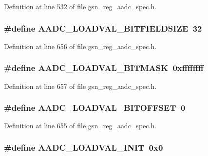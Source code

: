 Definition at line 532 of file gsn\_\-reg\_\-aadc\_\-spec.h.

\hypertarget{a00543_a5081bd03786964121c7734bd7abce77c}{
\subsubsection[{AADC\_\-LOADVAL\_\-BITFIELDSIZE}]{\setlength{\rightskip}{0pt plus 5cm}\#define AADC\_\-LOADVAL\_\-BITFIELDSIZE~32}}
\label{a00543_a5081bd03786964121c7734bd7abce77c}


Definition at line 656 of file gsn\_\-reg\_\-aadc\_\-spec.h.

\hypertarget{a00543_a66a33f4df5bfa31f1e1d1631ca8ada54}{
\subsubsection[{AADC\_\-LOADVAL\_\-BITMASK}]{\setlength{\rightskip}{0pt plus 5cm}\#define AADC\_\-LOADVAL\_\-BITMASK~0xffffffff}}
\label{a00543_a66a33f4df5bfa31f1e1d1631ca8ada54}


Definition at line 657 of file gsn\_\-reg\_\-aadc\_\-spec.h.

\hypertarget{a00543_afbca70841aa7da2fce3c1b3b613a2fd6}{
\subsubsection[{AADC\_\-LOADVAL\_\-BITOFFSET}]{\setlength{\rightskip}{0pt plus 5cm}\#define AADC\_\-LOADVAL\_\-BITOFFSET~0}}
\label{a00543_afbca70841aa7da2fce3c1b3b613a2fd6}


Definition at line 655 of file gsn\_\-reg\_\-aadc\_\-spec.h.

\hypertarget{a00543_add5ea00fcf56ab200059f40ddab4d021}{
\subsubsection[{AADC\_\-LOADVAL\_\-INIT}]{\setlength{\rightskip}{0pt plus 5cm}\#define AADC\_\-LOADVAL\_\-INIT~0x0}}
\label{a00543_add5ea00fcf56ab200059f40ddab4d021}


